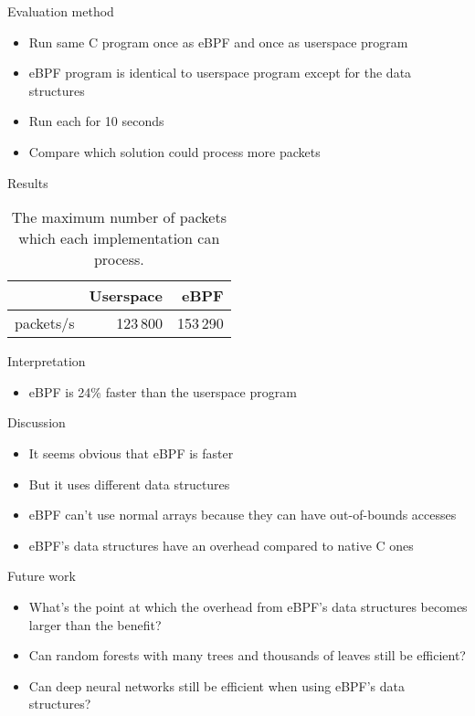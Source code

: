 \documentclass[xcolor={dvipsnames}]{beamer}
\begin{document}
\begin{frame}{Evaluation method}
\begin{itemize}
\item Run same C program once as eBPF and once as userspace program
\item eBPF program is identical to userspace program except for the data structures
\item Run each for 10 seconds
\item Compare which solution could process more packets
\end{itemize}
\end{frame}

\begin{frame}{Results}
\begin{table}[h]
\caption{The maximum number of packets which each implementation can process.} \label{tab:comparison}
\centering
\begin{tabular}{rrr} \toprule
& Userspace & eBPF \\ \midrule
packets/s & 123\,800 & 153\,290 \\
\bottomrule
\end{tabular}
\end{table}
\end{frame}

\begin{frame}{Interpretation}
\begin{itemize}
\item eBPF is 24\% faster than the userspace program
\end{itemize}
\end{frame}

\begin{frame}{Discussion}
\begin{itemize}
\item It seems obvious that eBPF is faster
\item But it uses different data structures
\item eBPF can't use normal arrays because they can have out-of-bounds accesses
\item eBPF's data structures have an overhead compared to native C ones
\end{itemize}
\end{frame}

\begin{frame}{Future work}
\begin{itemize}
\item What's the point at which the overhead from eBPF's data structures becomes larger than the benefit?
\item Can random forests with many trees and thousands of leaves still be efficient?
\item Can deep neural networks still be efficient when using eBPF's data structures?
\end{itemize}
\end{frame}


\makelastslide
\end{document}
